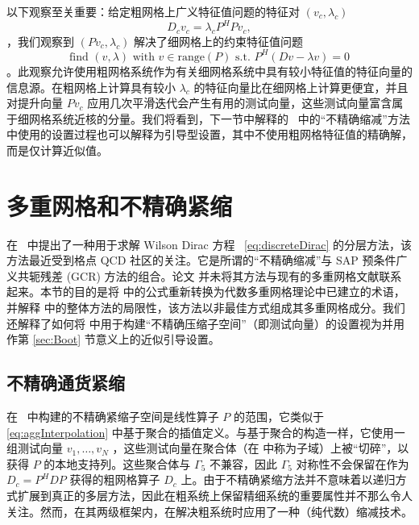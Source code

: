 \documentclass{siamltex}
\begin{document}
以下观察至关重要：给定粗网格上广义特征值问题的特征对    $(v_{c},\lambda_{c})$
\begin{equation*}
  D_{c}v_{c} = \lambda_{c} P^H Pv_{c},
\end{equation*}   ，我们观察到    $(Pv_c,\lambda_c)$    解决了细网格上的约束特征值问题
\begin{equation*}
  \text{find \  } (v,\lambda) \text{ \  with \  } v \in \mbox{range}(P) \text{ \  s.t. \  } P^H \left(Dv - \lambda v\right) = 0
\end{equation*}   。此观察允许使用粗网格系统作为有关细网格系统中具有较小特征值的特征向量的信息源。在粗网格上计算具有较小    $\lambda_{c}$    的特征向量比在细网格上计算更便宜，并且对提升向量    $Pv_{c}$    应用几次平滑迭代会产生有用的测试向量，这些测试向量富含属于细网格系统近核的分量。我们将看到，下一节中解释的~    \cite{Luescher2007}    中的“不精确缩减”方法中使用的设置过程也可以解释为引导型设置，其中不使用粗网格特征值的精确解，而是仅计算近似值。
\section{多重网格和不精确紧缩  }       \label{sec:PID}    在~    \cite{Luescher2007}    中提出了一种用于求解 Wilson Dirac 方程~    \eqref{eq:discreteDirac}    的分层方法，该方法最近受到格点 QCD 社区的关注。它是所谓的“不精确缩减”与 SAP 预条件广义共轭残差 (GCR) 方法的组合。论文    \cite{Luescher2007}    并未将其方法与现有的多重网格文献联系起来。本节的目的是将    \cite{Luescher2007}    中的公式重新转换为代数多重网格理论中已建立的术语，并解释    \cite{Luescher2007}    中的整体方法的局限性，该方法以非最佳方式组成其多重网格成分。我们还解释了如何将    \cite{Luescher2007}    中用于构建“不精确压缩子空间”（即测试向量）的设置视为并用作第    \ref{sec:Boot}    节意义上的近似引导设置。
\subsection{不精确通货紧缩  }       \label{sec:ID}    在~    \cite{Luescher2007}    中构建的不精确紧缩子空间是线性算子    $P$    的范围，它类似于~    \eqref{eq:aggInterpolation}    中基于聚合的插值定义。与基于聚合的构造一样，它使用一组测试向量    $v_1, \ldots, v_{N}$   ，这些测试向量在聚合体（在    \cite{Luescher2007}    中称为子域）上被“切碎”，以获得    $P$    的本地支持列。这些聚合体与    $\Gamma_5$    不兼容，因此    $\Gamma_5$    对称性不会保留在作为    $D_c = P^HDP$    获得的粗网格算子    $D_c$    上。由于不精确紧缩方法并不意味着以递归方式扩展到真正的多层方法，因此在粗系统上保留精细系统的重要属性并不那么令人关注。然而，在其两级框架内，在解决粗系统时应用了一种（纯代数）缩减技术。
\end{document}
